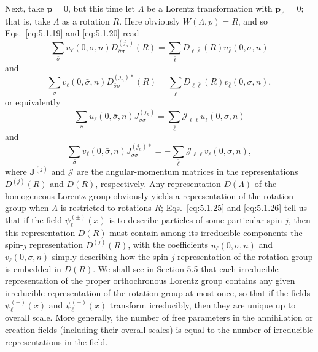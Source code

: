 Next, take $\mathbf{p}=0$, but this time let $\Lambda$ be a Lorentz
transformation with $\mathbf{p}_\Lambda=0$; that is, take $\Lambda$ as a
rotation $R$. Here obviously $W(\Lambda,p)=R$, and so Eqs.~\eqref{eq:5.1.19} and
\eqref{eq:5.1.20} read
\begin{equation}
  \sum_{\bar\sigma}u_\ell(0,\bar\sigma,n)D^{(j_n)}_{\bar\sigma\sigma}(R)
  =\sum_{\bar\ell}D_{\ell\bar\ell}(R)u_{\bar\ell}(0,\sigma,n)
  \tag{5.1.23}\label{eq:5.1.23}
\end{equation}
and
\begin{equation}
  \sum_{\bar\sigma}v_\ell(0,\bar\sigma,n)D^{(j_n)*}_{\bar\sigma\sigma}(R)
  =\sum_{\bar\ell}D_{\ell\bar\ell}(R)v_{\bar\ell}(0,\sigma,n),
  \tag{5.1.24}\label{eq:5.1.24}
\end{equation}
or equivalently
\begin{equation}
  \sum_{\bar\sigma}u_\ell(0,\bar\sigma,n)J^{(j_n)}_{\bar\sigma\sigma}
  =\sum_{\bar\ell}\mathcal{J}_{\ell\bar\ell}u_{\bar\ell}(0,\sigma,n)
  \tag{5.1.25}\label{eq:5.1.25}
\end{equation}
and
\begin{equation}
  \sum_{\bar\sigma}v_\ell(0,\bar\sigma,n)J^{(j_n)*}_{\bar\sigma\sigma}
  =-\sum_{\bar\ell}\mathcal{J}_{\ell\bar\ell}v_{\bar\ell}(0,\sigma,n),
  \tag{5.1.26}\label{eq:5.1.26}
\end{equation}
where $\mathbf{J}^{(j)}$ and $\boldsymbol{\mathcal{J}}$ are the angular-momentum
matrices in the representations $D^{(j)}(R)$ and $D(R)$, respectively. Any
representation $D(\Lambda)$ of the homogeneous Lorentz group obviously yields
a representation of the rotation group when $\Lambda$ is restricted to
rotations $R$; Eqs.~\eqref{eq:5.1.25} and \eqref{eq:5.1.26} tell us that if the field
$\psi^{(\pm)}_\ell(x)$ is to describe particles of some particular spin $j$,
then this representation $D(R)$ must contain among its irreducible components
the spin-$j$ representation $D^{(j)}(R)$, with the coefficients
$u_\ell(0,\sigma,n)$ and $v_\ell(0,\sigma,n)$ simply describing how the spin-$j$
representation of the rotation group is embedded in $D(R)$. We shall see in
Section 5.5 that each irreducible representation of the proper orthochronous
Lorentz group contains any given irreducible representation of the rotation
group at most once, so that if the fields $\psi^{(+)}_\ell(x)$ and
$\psi^{(-)}_\ell(x)$ transform irreducibly, then they are unique up to overall
scale. More generally, the number of free parameters in the annihilation or
creation fields (including their overall scales) is equal to the number of
irreducible representations in the field.

